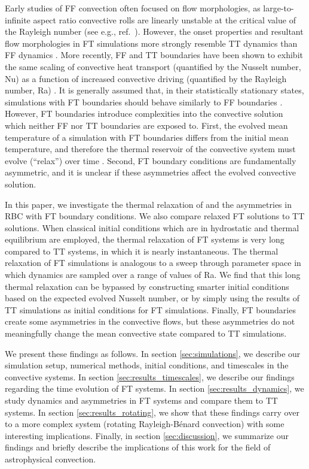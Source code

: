 \documentclass[aps, pre, onecolumn, nofootinbib, notitlepage, groupedaddress, amsfonts, amssymb, amsmath, longbibliography, superscriptaddress]{revtex4-1}
\newcommand{\RB}{Rayleigh-B\'{e}nard }
\newcommand{\ea}[1]{{\color{red} #1}}
\begin{document}
\ea{Early studies of FF convection often focused on flow morphologies, as large-to-infinite aspect ratio convective rolls are linearly unstable at the critical value of the Rayleigh number (see e.g., ref.~\cite{chapman&proctor1980}).
However, the onset properties and resultant flow morphologies in FT simulations more strongly resemble TT dynamics than FF dynamics \cite{ishiwatari&all1994}.}
\ea{More recently,} FF and TT boundaries \ea{have been shown to} exhibit the same scaling of convective heat transport (quantified by the Nusselt number, Nu) as a function of increased convective driving (quantified by the Rayleigh number, Ra) \cite{johnston&doering2009}.
It is generally assumed that, \ea{in their statistically stationary states, simulations with} FT boundaries should behave similarly to FF boundaries \cite{goluskin2016, otero&all2002}.
However, FT boundaries introduce complexities into the convective solution which neither FF nor TT boundaries are exposed to.
First, the evolved mean temperature of a simulation with FT boundaries differs from the initial mean temperature, and therefore the thermal reservoir of the convective system must evolve (``relax'') over time \cite{anders&all2018}.
Second, FT boundary conditions are fundamentally asymmetric, and it is unclear if these asymmetries affect the evolved convective solution.

In this paper, we investigate the thermal relaxation of and the asymmetries in RBC with FT boundary conditions.
We also compare relaxed FT solutions to TT solutions.
\ea{When classical initial conditions which are in hydrostatic and thermal equilibrium are employed,} the thermal relaxation of FT systems is very long compared to TT systems, in which it is nearly instantaneous.
The thermal relaxation of FT simulations is analogous to a sweep through parameter space in which dynamics are sampled over a range of values of Ra.
We find that this long thermal relaxation can be bypassed by \ea{constructing smarter initial conditions based on the expected evolved Nusselt number, or by simply} using the results of TT simulations as initial conditions for FT simulations.
Finally, FT boundaries create some asymmetries in the convective flows, but these asymmetries do not meaningfully change the mean convective state compared to TT simulations.

We present these findings as follows.
In section \ref{sec:simulations}, we describe our simulation setup, numerical methods, \ea{initial conditions, and timescales in the convective systems}.
In section \ref{sec:results_timescales}, we describe our findings \ea{regarding} the time evolution of FT systems.
\ea{In section \ref{sec:results_dynamics}, we study dynamics and asymmetries in FT systems and compare them to TT systems.}
In section \ref{sec:results_rotating}, we show that these findings carry over to a more complex system (rotating \RB convection) with some interesting implications.
Finally, in section \ref{sec:discussion}, we summarize our findings and briefly describe the implications of this work for the field of astrophysical convection.
\end{document}
